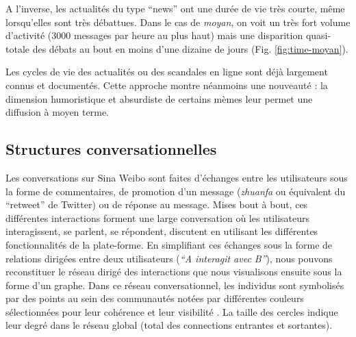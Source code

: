 A l{\textquoteright}inverse, les actualités du type {\textquotedblleft}news{\textquotedblright} ont une durée de vie très courte, même lorsqu{\textquoteright}elles sont très débattues. Dans le cas de \textit{moyan}, on voit un très fort volume d{\textquoteright}activité (3000 messages par heure au plus haut) mais une disparition quasi-totale des débats au bout en moins d{\textquoteright}une dizaine de jours (Fig. \ref{fig:time-moyan}).

Les cycles de vie des actualités ou des scandales en ligne sont déjà largement connus et documentés. Cette approche montre néanmoins une nouveauté : la dimension humoristique et absurdiste de certains mèmes leur permet une diffusion à moyen terme.

\subsection[Structures conversationnelles]{Structures conversationnelles}

Les conversations sur Sina Weibo sont faites d{\textquoteright}échanges entre les utilisateurs sous la forme de commentaires, de promotion d{\textquoteright}un message (\textit{zhuanfa} ou  équivalent du {\textquotedblleft}retweet{\textquotedblright} de Twitter) ou de réponse au message. Mises bout à bout, ces différentes interactions forment une large conversation o\`u les utilisateurs interagissent, se parlent, se répondent, discutent en utilisant les différentes fonctionnalités de la plate-forme. En simplifiant ces échanges sous la forme de relations dirigées entre deux utilisateurs (\textit{{\textquotedblleft}A interagit avec B{\textquotedblright}}), nous pouvons reconstituer le réseau dirigé des interactions que nous visualisons ensuite sous la forme d{\textquoteright}un graphe. Dans ce réseau conversationnel, les individus sont symbolisés par des points au sein des communautés notées par différentes couleurs sélectionnées pour leur cohérence et leur visibilité \citep{Lin2013}. La taille des cercles indique leur degré dans le réseau global (total des connections entrantes et sortantes).


